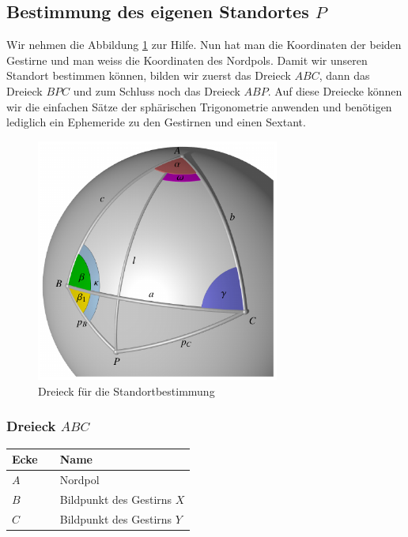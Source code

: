 \subsection{Bestimmung des eigenen Standortes $P$} \label{p}
Wir nehmen die Abbildung \ref{d2} zur Hilfe.
Nun hat man die Koordinaten der beiden Gestirne und man weiss die Koordinaten des Nordpols.
Damit wir unseren Standort bestimmen können, bilden wir zuerst das Dreieck $ABC$, dann das Dreieck $BPC$ und zum Schluss noch das Dreieck $ABP$.
Auf diese Dreiecke können wir die einfachen Sätze der sphärischen Trigonometrie anwenden und benötigen lediglich ein Ephemeride zu den Gestirnen und einen Sextant.

\begin{figure}
\centering
	\includegraphics[width=8cm]{papers/nav/images/dreieck3d8.pdf}
	\caption[Dreieck für die Standortbestimmung]{Dreieck für die Standortbestimmung}
	\label{d2}
\end{figure}

\subsubsection{Dreieck $ABC$}

\begin{center}
	\begin{tabular}{ l l l }
		Ecke && Name  \\ 
		\hline
		$A$ && Nordpol \\  
		$B$ && Bildpunkt des Gestirns $X$ \\
		$C$&& Bildpunkt des Gestirns $Y$
	\end{tabular}
\end{center}

